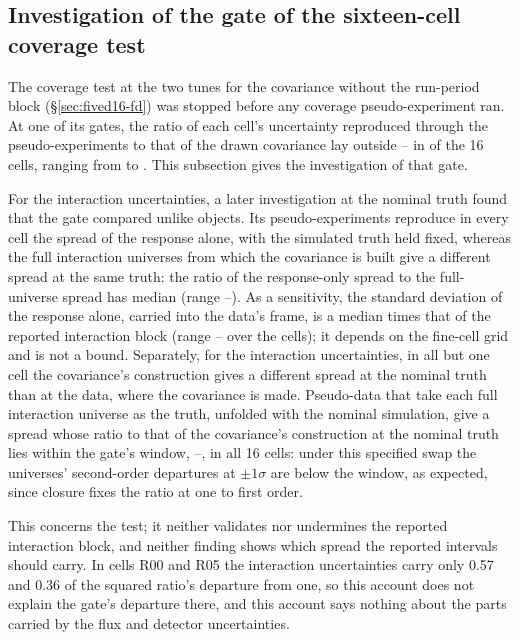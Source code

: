 \subsection{Investigation of the gate of the sixteen-cell coverage test}
\label{sec:cov1b-gate}
The coverage test at the two tunes for the covariance without the run-period block (\S\ref{sec:fived16-fd}) was stopped before any coverage pseudo-experiment ran. At one of its gates, the ratio of each cell's uncertainty reproduced through the pseudo-experiments to that of the drawn covariance lay outside -- in  of the 16 cells, ranging from  to . This subsection gives the investigation of that gate.

For the interaction uncertainties, a later investigation at the nominal truth found that the gate compared unlike objects. Its pseudo-experiments reproduce in every cell the spread of the response alone, with the simulated truth held fixed, whereas the full interaction universes from which the covariance is built give a different spread at the same truth: the ratio of the response-only spread to the full-universe spread has median  (range --). As a sensitivity, the standard deviation of the response alone, carried into the data's frame, is a median  times that of the reported interaction block (range -- over the cells); it depends on the fine-cell grid and is not a bound. Separately, for the interaction uncertainties, in all but one cell the covariance's construction gives a different spread at the nominal truth than at the data, where the covariance is made. Pseudo-data that take each full interaction universe as the truth, unfolded with the nominal simulation, give a spread whose ratio to that of the covariance's construction at the nominal truth lies within the gate's window, --, in all 16 cells: under this specified swap the universes' second-order departures at $\pm1\sigma$ are below the window, as expected, since closure fixes the ratio at one to first order.

This concerns the test; it neither validates nor undermines the reported interaction block, and neither finding shows which spread the reported intervals should carry. In cells R00 and R05 the interaction uncertainties carry only 0.57 and 0.36 of the squared ratio's departure from one, so this account does not explain the gate's departure there, and this account says nothing about the parts carried by the flux and detector uncertainties.

